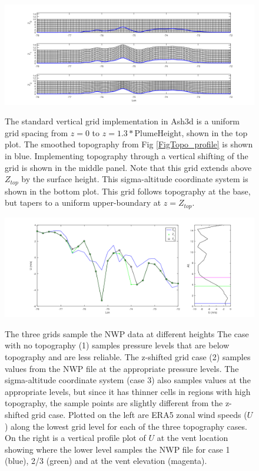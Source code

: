 \begin{figure}[htbp]\vspace*{0cm}\hspace*{0cm}
\includegraphics[angle=0,scale=0.4]{Figures/Apx_Topo/Topo_Grids.png}\\
\parbox{15cm}{\caption{\label{FigTopo_grids}
The standard vertical grid implementation in Ash3d is a uniform grid spacing from $z=0$
to $z=1.3*\mathrm{PlumeHeight}$, shown in the top plot. The smoothed topography from
Fig \ref{FigTopo_profile} is shown in blue. Implementing topography through a vertical
shifting of the grid is shown in the middle panel. Note that this grid extends above
$Z_{top}$ by the surface height. This sigma-altitude coordinate system is shown in the
bottom plot. This grid follows topography at the base, but tapers to a uniform upper-boundary
at $z=Z_{top}$.
}}
\end{figure}

\begin{figure}[htbp]\vspace*{0cm}\hspace*{0cm}
\includegraphics[angle=0,scale=0.4]{Figures/Apx_Topo/Topo_U.png}\\
\parbox{15cm}{\caption{\label{FigTopo_SurfU}
The three grids sample the NWP data at different heights
The case with no topography (1) samples pressure levels that are below topography
and are less reliable. The z-shifted grid case (2) samples values from the NWP file
at the appropriate pressure levels. The sigma-altitude coordinate system (case 3) also
samples values at the appropriate levels, but since it has thinner cells in regions with
high topography, the sample points are slightly different from the z-shifted
grid case. Plotted on the left are ERA5 zonal wind speeds ($U$) along the lowest grid
level for each of the three topography cases. On the right is a vertical profile plot of $U$
at the vent location showing where the lower level samples the NWP file for case 1 (blue),
2/3 (green) and at the vent elevation (magenta).
}}
\end{figure}

